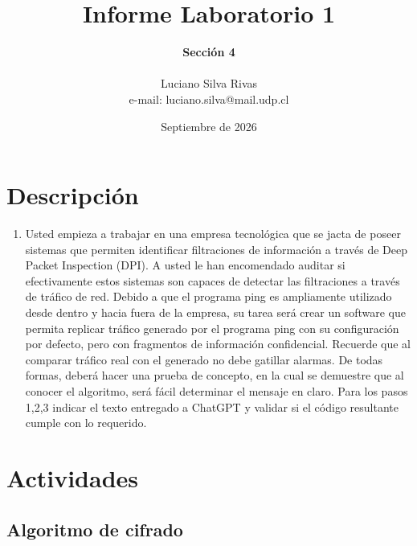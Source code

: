 \documentclass[letter,12pt]{article}
\begin{document}
%
   \title{\Huge{Informe Laboratorio 1}}

   \author{\textbf{Sección 4} \\  \\Luciano Silva Rivas \\ e-mail: luciano.silva@mail.udp.cl}
          
   \date{Septiembre de 2026}

   \maketitle
   
   \tableofcontents
 
  \newpage
  

\section{Descripción}

\begin{enumerate}
    \item  Usted empieza a trabajar en una empresa tecnológica que se jacta de poseer sistemas que permiten identificar filtraciones de información a través de Deep Packet Inspection (DPI).
    A usted le han encomendado auditar si efectivamente estos sistemas son capaces de detectar las filtraciones a través de tráfico de red. Debido a que el programa ping es ampliamente utilizado desde dentro y hacia fuera de la empresa, su tarea será crear un software que permita replicar tráfico generado por el programa ping con su configuración por defecto, pero con fragmentos de información confidencial. Recuerde que al comparar tráfico real con el generado no debe gatillar alarmas.
    De todas formas, deberá hacer una prueba de concepto, en la cual se demuestre que al conocer el algoritmo, será fácil determinar el mensaje en claro.
    Para los pasos 1,2,3 indicar el texto entregado a ChatGPT y validar si el código resultante cumple con lo requerido.


\end{enumerate}


\section{Actividades}


\subsection{Algoritmo de cifrado}
\end{document}
